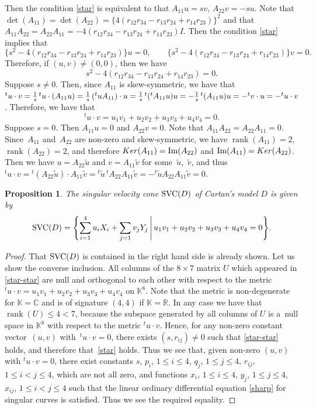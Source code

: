 \documentclass[11pt]{article}
\numberwithin{equation}{section}
\numberwithin{equation}{section}
\newtheorem{Proposition}[Theorem]{Proposition}
 { \theoremstyle{definition}
\newtheorem{Definition}[Theorem]{Definition}
\newtheorem{Note}[Theorem]{Note}
\newtheorem{Example}[Theorem]{Example}
\newtheorem{Remark}[Theorem]{Remark} }
\theoremstyle{definition}
\newcommand{\R}{\mathbb{R}}
\newcommand{\C}{\mathbb{C}}
\newcommand{\KK}{\mathbb{K}}
\newcommand{\0}{\boldsymbol{0}}
\newcommand{\rank}{\operatorname{rank}}
\newcommand{\SVC}{{\mbox {\rm SVC}}}
\begin{document}
Then the condition \eqref{star} is equivalent to that
$A_{11}u = sv$, $A_{22}v = -su$. Note that $\det(A_{11}) = \det(A_{22}) = \{4(r_{12}r_{34} - r_{13}r_{24} + r_{14}r_{23})\}^2$
and that
$A_{11}A_{22} = A_{22}A_{11} = -4(r_{12}r_{34} - r_{13}r_{24} + r_{14}r_{23})I$. Then
the condition \eqref{star} implies that
\[
\bigl\{ s^2 - 4(r_{12}r_{34} - r_{13}r_{24} + r_{14}r_{23})\bigr\}u = 0, \qquad \bigl\{ s^2 - 4(r_{12}r_{34} - r_{13}r_{24} + r_{14}r_{23})\bigr\}v = 0.
\]
Therefore, if $(u, v) \not= (0, 0)$, then we have
\[
s^2 - 4(r_{12}r_{34} - r_{13}r_{24} + r_{14}r_{23}) = 0.
\]
Suppose $s \not= 0$. Then, since $A_{11}$ is skew-symmetric, we have that
${}^tu\cdot v = \smash{\frac{1}{s}\,{}^tu\cdot(A_{11}u)} = \smash{\frac{1}{s}\,({}^tuA_{11})\cdot u} = \smash{\frac{1}{s}\,{}^t({}^tA_{11}u)u} = - \smash{\frac{1}{s}\,{}^t(A_{11}u)u} = - {}^tv\cdot u = - {}^tu\cdot v$.
Therefore, we have that
\[
{}^tu \cdot v = u_1v_1 + u_2v_2 + u_3v_3 + u_4v_4 = 0.
\]
Suppose $s = 0$. Then $A_{11}u = 0$ and $A_{22}v = 0$. Note that $A_{11}A_{22} = A_{22}A_{11} = 0$.
Since~$A_{11}$ and~$A_{22}$ are non-zero and skew-symmetric, we have $\rank(A_{11}) = 2$, $\rank(A_{22}) = 2$, and
therefore ${\rm Ker}(A_{11}) = {\mbox{\rm Im}}(A_{22})$ and ${\mbox{\rm Im}}(A_{11}) = {\rm Ker}(A_{22})$.
Then we have $u = A_{22}\tilde{u}$ and $v = A_{11}\tilde{v}$ for some~$\tilde{u}$,~$\tilde{v}$, and thus
${}^tu\cdot v = {}^t(A_{22}\tilde{u})\cdot A_{11}\tilde{v} = {}^t\tilde{u}\,{}^t\!A_{22}A_{11}\tilde{v} = - {}^t\tilde{u}A_{22}A_{11}\tilde{v} = 0$.

\begin{Proposition}
The singular velocity cone $\SVC(D)$ of Cartan's model $D$ is given by
\[
\SVC(D) = \Biggl\{ \sum_{i=1}^4 u_iX_i + \sum_{j=1} v_jY_j \,
\Bigg\vert\, u_1v_1 + u_2v_2 + u_3v_3 + u_4v_4 = 0\Biggr\}.
\]
\end{Proposition}

\begin{proof}
That $\SVC(D)$ is contained in the right hand side is already shown. Let us show the converse inclusion.
All columns of the $8\times 7$ matrix $U$ which appeared in \eqref{star-star} are
null and orthogonal to each other with respect to the metric ${}^tu\cdot v =
u_1v_1 + u_2v_2 + u_3v_3 + u_4v_4$ on $\KK^8$. Note that the metric is non-degenerate for $\KK = \C$
and is of signature $(4, 4)$ if $\KK = \R$.
In any case we have that $\rank(U) \leq 4 < 7$, because the subspace generated by all columns of $U$
is a~null space in $\KK^8$ with respect to the metric ${}^tu\cdot v$.
Hence, for any non-zero constant vector~$(u, v)$ with~${{}^tu\cdot v = 0}$, there exists $(s, r_{ij}) \not= 0$ such that \eqref{star-star} holds, and therefore that~\eqref{star} holds. Thus we see that, given non-zero $(u, v)$ with ${}^tu\cdot v = 0$,
there exist constants $s$, $p_i$, $1 \leq i \leq 4$, $q_j$, $1 \leq j \leq 4$, $r_{ij}$, $1 \leq i < j \leq 4$, which are not all zero,
and functions $x_i$, $1 \leq i \leq 4$, $y_j$, $1 \leq j \leq 4$, $x_{ij}$, $1 \leq i < j \leq 4$
such that the linear ordinary differential equation \eqref{sharp} for singular curves is satisfied.
Thus we see the required equality.
\end{proof}
\end{document}

